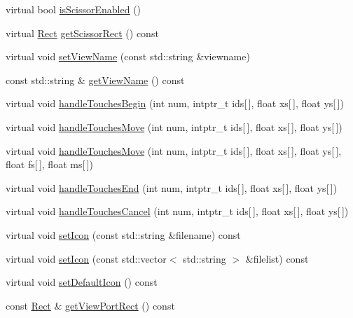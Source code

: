 \begin{DoxyCompactItemize}
virtual bool \hyperlink{classGLView_ae7de84c958af33c5e3f049014928f242}{is\+Scissor\+Enabled} ()
\item 
virtual \hyperlink{classRect}{Rect} \hyperlink{classGLView_a3d3f1a186da65fd5787740f95f17dbbe}{get\+Scissor\+Rect} () const
\item 
virtual void \hyperlink{classGLView_a141e0fbac581ef3404a8d57cc7e8453f}{set\+View\+Name} (const std\+::string \&viewname)
\item 
const std\+::string \& \hyperlink{classGLView_acfeda35caf23db9ae26fa07b5fc7dda1}{get\+View\+Name} () const
\item 
virtual void \hyperlink{classGLView_acfa810096bdf2755333b34a28637c800}{handle\+Touches\+Begin} (int num, intptr\+\_\+t ids\mbox{[}$\,$\mbox{]}, float xs\mbox{[}$\,$\mbox{]}, float ys\mbox{[}$\,$\mbox{]})
\item 
virtual void \hyperlink{classGLView_a7b7dfb9bb8402d5b4661ff385fac0acb}{handle\+Touches\+Move} (int num, intptr\+\_\+t ids\mbox{[}$\,$\mbox{]}, float xs\mbox{[}$\,$\mbox{]}, float ys\mbox{[}$\,$\mbox{]})
\item 
virtual void \hyperlink{classGLView_af0602750d445ba834c08914ccf747ce5}{handle\+Touches\+Move} (int num, intptr\+\_\+t ids\mbox{[}$\,$\mbox{]}, float xs\mbox{[}$\,$\mbox{]}, float ys\mbox{[}$\,$\mbox{]}, float fs\mbox{[}$\,$\mbox{]}, float ms\mbox{[}$\,$\mbox{]})
\item 
virtual void \hyperlink{classGLView_a09f7e2f850149f7064e3f6d1f8bad8a3}{handle\+Touches\+End} (int num, intptr\+\_\+t ids\mbox{[}$\,$\mbox{]}, float xs\mbox{[}$\,$\mbox{]}, float ys\mbox{[}$\,$\mbox{]})
\item 
virtual void \hyperlink{classGLView_ac5963abf17c7363af3374877910b0a88}{handle\+Touches\+Cancel} (int num, intptr\+\_\+t ids\mbox{[}$\,$\mbox{]}, float xs\mbox{[}$\,$\mbox{]}, float ys\mbox{[}$\,$\mbox{]})
\item 
virtual void \hyperlink{classGLView_a3f7af6e8ef7059255a6626c86ecce17e}{set\+Icon} (const std\+::string \&filename) const
\item 
virtual void \hyperlink{classGLView_a35b469df944ab7e768e20dc1803154fe}{set\+Icon} (const std\+::vector$<$ std\+::string $>$ \&filelist) const
\item 
virtual void \hyperlink{classGLView_a27d3fd61c627780fa1cf2b1357f07d15}{set\+Default\+Icon} () const
\item 
const \hyperlink{classRect}{Rect} \& \hyperlink{classGLView_ac34de16bd3fd4eb1a524e77b18f47546}{get\+View\+Port\+Rect} () const
\item 

\end{DoxyCompactItemize}
